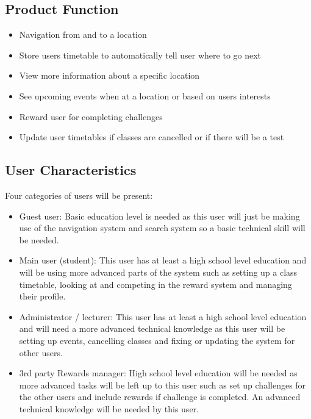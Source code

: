 \documentclass{article}
\begin{document}
	\subsection{Product Function}
		\begin{itemize}
	\item Navigation from and to a location
	\item Store users timetable to automatically tell user where to go next
	\item View more information about a specific location
	\item See upcoming events when at a location or based on users interests
	\item Reward user for completing challenges 
	\item Update user timetables if classes are cancelled or if there will be a test
	\end{itemize}
	\subsection{User Characteristics}
		Four categories of users will be present:
		\begin{itemize}

\item Guest user: Basic education level is needed as this user will just be making use of the navigation system and search system so a basic technical skill will be needed.
\item Main user (student): This user has at least a high school level education and will be using more advanced parts of the system such as setting up a class timetable, looking at and competing in the reward system and managing their profile.
\item Administrator / lecturer: This user has at least a high school level education and will need a more advanced technical knowledge as this user will be setting up events, cancelling classes and fixing or updating the system for other users.  
\item 3rd party Rewards manager: High school level education will be needed as more advanced tasks will be left up to this user such as set up challenges for the other users and include rewards if challenge is completed. An advanced technical knowledge will be needed by this user.

	\end{itemize}
\end{document}
